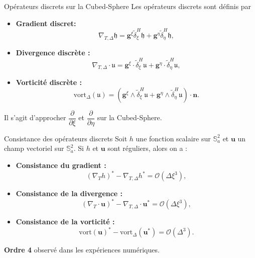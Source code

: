 \documentclass[11pt]{beamer}
\def\dxi{\tilde{\delta}^H_{\xi}}
\def\deta{\tilde{\delta}^H_{\eta}}
\begin{document}
\begin{frame}{Opérateurs discrets sur la Cubed-Sphere}
Les opérateurs discrets sont définis par
\begin{block}{}
\begin{itemize}
\item \textbf{Gradient discret:}
$$
\nabla_{T,\Delta} \mathfrak{h} = \mathbf{g}^{\xi} \dxi \mathfrak{h} + \mathbf{g}^{\eta} \deta \mathfrak{h},
$$
\item \textbf{Divergence discrète :}
$$
\nabla_{T,\Delta} \cdot \mathfrak{u} = \mathbf{g}^{\xi} \cdot \dxi \mathfrak{u} + \mathbf{g}^{\eta} \cdot \deta \mathfrak{u},
$$
\item \textbf{Vorticité discrète :}
$$
\text{vort}_{\Delta} (\mathfrak{u}) = \left( \mathbf{g}^{\xi} \wedge \dxi \mathfrak{u} + \mathbf{g}^{\eta} \wedge \deta \mathfrak{u} \right) \cdot \mathbf{n}.
$$
\end{itemize}
\end{block}
Il s'agit d'approcher $\dfrac{\partial}{\partial \xi}$ et $\dfrac{\partial}{\partial \eta}$ sur la Cubed-Sphere.
\end{frame}




\begin{frame}{Consistance des opérateurs discrets}
Soit $h$ une fonction scalaire sur $\mathbb{S}_a^2$ et $\mathbf{u}$ un champ vectoriel sur $\mathbb{S}_a^2$. Si $h$ et $\mathbf{u}$ sont réguliers, alors on a :
\begin{block}{}
\begin{itemize}
\item \textbf{Consistance du gradient :}
$$
(\nabla_T h)^* - \nabla_{T,\Delta} h^* = \mathcal{O}(\Delta \xi^3),
$$
\item \textbf{Consistance de la divergence :}
$$
(\nabla_T \cdot \mathbf{u})^* - \nabla_{T,\Delta} \cdot \mathbf{u}^* = \mathcal{O}(\Delta \xi^3),
$$
\item \textbf{Consistance de la vorticité :}
$$
\text{vort}(\mathbf{u})^* - \text{vort}_{\Delta}(\mathbf{u}^*) = \mathcal{O}(\Delta^3).
$$
\end{itemize}
\end{block}

\begin{alertblock}{}
\textbf{Ordre 4} observé dans les expériences numériques.
\end{alertblock}
\end{frame}
\end{document}
